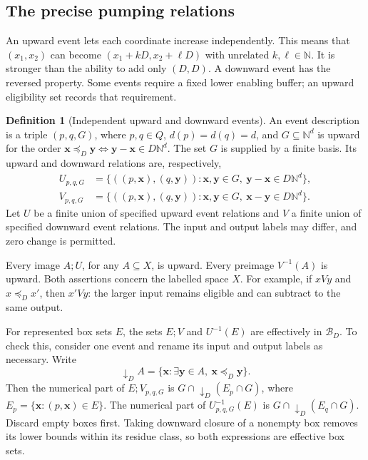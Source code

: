\documentclass[11pt,a4paper]{article}
\theoremstyle{definition}
\newtheorem{definition}[theorem]{Definition}
\theoremstyle{remark}
\newcommand{\N}{\mathbb N}
\begin{document}
\subsection{The precise pumping relations}

An upward event lets each coordinate increase independently. This
means that \((x_1,x_2)\) can become
\((x_1+kD,x_2+\ell D)\) with unrelated \(k,\ell\in\N\).
It is stronger than the ability to add only \((D,D)\).
A downward event has the reversed property. Some events require a
fixed lower enabling buffer; an upward eligibility set records that
requirement.

\begin{definition}[Independent upward and downward events]
\label{def:independent-events}
An event description is a triple \((p,q,G)\), where
\(p,q\in Q\), \(d(p)=d(q)=d\), and \(G\subseteq\N^d\) is upward
for the order
\(\boldsymbol x\preceq_D\boldsymbol y
\iff\boldsymbol y-\boldsymbol x\in D\N^d\).
The set \(G\) is supplied by a finite basis.
Its upward and downward relations are, respectively,
\[
\begin{split}
 U_{p,q,G}
 &=\{((p,\boldsymbol x),(q,\boldsymbol y)):
       \boldsymbol x,\boldsymbol y\in G,\
       \boldsymbol y-\boldsymbol x\in D\N^d\},\\
 V_{p,q,G}
 &=\{((p,\boldsymbol x),(q,\boldsymbol y)):
       \boldsymbol x,\boldsymbol y\in G,\
       \boldsymbol x-\boldsymbol y\in D\N^d\}.
\end{split}
\]
Let \(U\) be a finite union of specified upward event relations and
\(V\) a finite union of specified downward event relations.
The input and output labels may differ, and zero change is permitted.
\end{definition}

Every image \(A;U\), for any \(A\subseteq X\), is upward. Every
preimage \(V^{-1}(A)\) is upward. Both assertions concern the labelled
space \(X\). For example, if \(xVy\) and \(x\preceq_D x'\), then
\(x'Vy\): the larger input remains eligible and can subtract to the
same output.

For represented box sets \(E\), the sets \(E;V\) and \(U^{-1}(E)\)
are effectively in \(\mathcal B_D\). To check this, consider one
event and rename its input and output labels as necessary. Write
\[
 \mathord{\downarrow_D}A
  =\{\boldsymbol x:\exists\boldsymbol y\in A,\
                         \boldsymbol x\preceq_D\boldsymbol y\}.
\]
Then the numerical part of \(E;V_{p,q,G}\) is
\(G\cap\mathord{\downarrow_D}(E_p\cap G)\), where
\(E_p=\{\boldsymbol x:(p,\boldsymbol x)\in E\}\).
The numerical part of \(U_{p,q,G}^{-1}(E)\) is
\(G\cap\mathord{\downarrow_D}(E_q\cap G)\).
Discard empty boxes first. Taking downward closure of a nonempty box removes its lower bounds
within its residue class, so both expressions are effective box sets.
\end{document}
